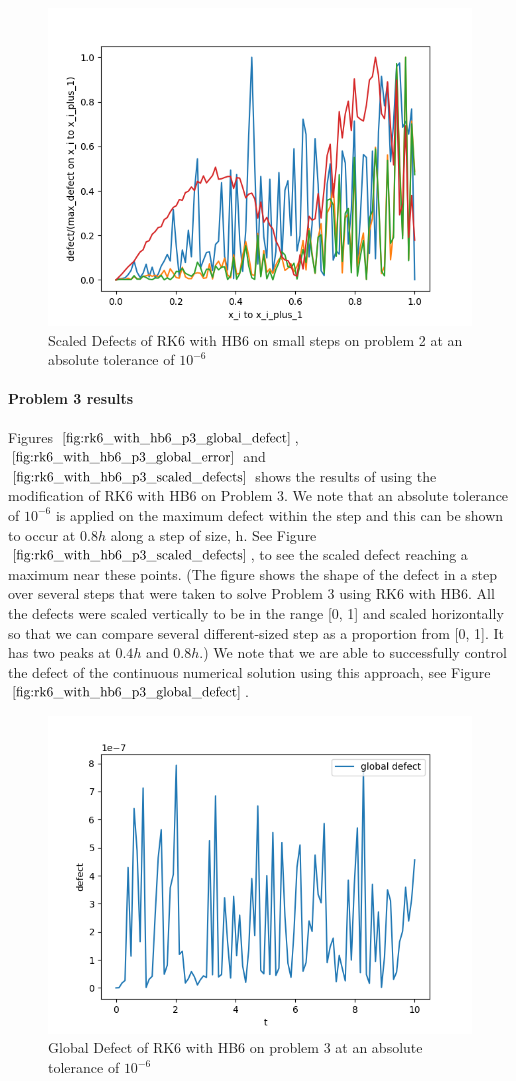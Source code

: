 \documentclass{article}
\begin{document}
\begin{figure}[H]
\centering
\includegraphics[width=0.7\linewidth]{./figures/rk6_with_hb6_p2_scaled_defects_small_steps}
\caption{Scaled Defects of RK6 with HB6 on small steps on problem 2 at an absolute tolerance of $10^{-6}$}
\label{fig:rk6_with_hb6_p2_scaled_defects_small_steps}
\end{figure}

\paragraph{Problem 3 results}
Figures $\ref{fig:rk6_with_hb6_p3_global_defect}$, $\ref{fig:rk6_with_hb6_p3_global_error}$ and $\ref{fig:rk6_with_hb6_p3_scaled_defects}$ shows the results of using the modification of RK6 with HB6 on Problem 3. 
We note that an absolute tolerance of $10^{-6}$ is applied on the maximum defect within the step and this can be shown to occur at $0.8h$ along a step of size, h. See Figure $\ref{fig:rk6_with_hb6_p3_scaled_defects}$, to see the scaled defect reaching a maximum near these points. (The figure shows the shape of the defect in a step over several steps that were taken to solve Problem 3 using RK6 with HB6. All the defects were scaled vertically to be in the range [0, 1] and scaled horizontally so that we can compare several different-sized step as a proportion from [0, 1]. It has two peaks at $0.4h$ and $0.8h$.) We note that we are able to successfully control the defect of the continuous numerical solution using this approach, see Figure $\ref{fig:rk6_with_hb6_p3_global_defect}$. 

\begin{figure}[H]
\centering
\includegraphics[width=0.7\linewidth]{./figures/rk6_with_hb6_p3_global_defect}
\caption{Global Defect of RK6 with HB6 on problem 3 at an absolute tolerance of $10^{-6}$}
\label{fig:rk6_with_hb6_p3_global_defect}
\end{figure}
\end{document}
